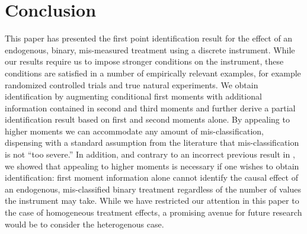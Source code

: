 \section{Conclusion}
This paper has presented the first point identification result for the effect of an endogenous, binary, mis-measured treatment using a discrete instrument.
While our results require us to impose stronger conditions on the instrument, these conditions are satisfied in a number of empirically relevant examples, for example randomized controlled trials and true natural experiments.
We obtain identification by augmenting conditional first moments with additional information contained in second and third moments and further derive a partial identification result based on first and second moments alone.
By appealing to higher moments we can accommodate any amount of mis-classification, dispensing with a standard assumption from the literature that mis-classification is not ``too severe.''
In addition, and contrary to an incorrect previous result in \cite{Mahajan}, we showed that appealing to higher moments is necessary if one wishes to obtain identification: first moment information alone cannot identify the causal effect of an endogenous, mis-classified binary treatment regardless of the number of values the instrument may take.
While we have restricted our attention in this paper to the case of homogeneous treatment effects, a promising avenue for future research would be to consider the heterogenous case.
